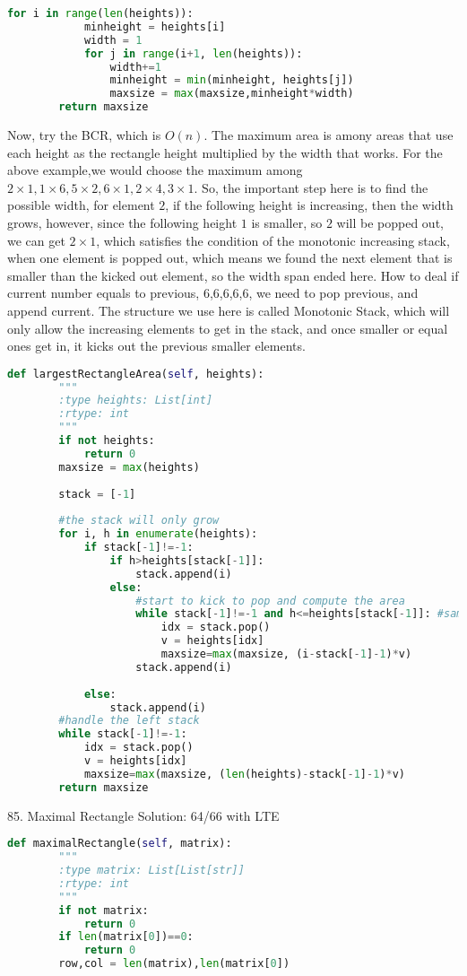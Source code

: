 \documentclass[../main.tex]{subfiles}
\begin{document}
\begin{examples}[resume]
\begin{lstlisting}[language = Python]
        for i in range(len(heights)):
            minheight = heights[i]
            width = 1
            for j in range(i+1, len(heights)):
                width+=1
                minheight = min(minheight, heights[j])
                maxsize = max(maxsize,minheight*width)
        return maxsize
\end{lstlisting}
Now, try the BCR, which is $O(n)$. The maximum area is amony areas that use each height as the rectangle  height multiplied by the width that works. For the above example,we would choose the maximum among $2\times 1, 1\times 6, 5\times 2, 6\times 1, 2\times 4, 3\times 1$. So, the important step here is to find the possible width, for element $2$, if the following height is increasing, then the width grows, however, since the following height $1$ is smaller, so $2$ will be popped out, we can get $2\times 1$, which satisfies the condition of the monotonic increasing stack, when one element is popped out, which means we found the next element that is smaller than the kicked out element, so the width span ended here. How to deal if current number equals to previous, 6,6,6,6,6, we need to pop previous, and append current. The structure we use here is called Monotonic Stack, which will only allow the increasing elements to get in the stack, and once smaller or equal ones get in, it kicks out the previous smaller elements.
\begin{lstlisting}[language = Python]
def largestRectangleArea(self, heights):
        """
        :type heights: List[int]
        :rtype: int
        """
        if not heights:
            return 0
        maxsize = max(heights)
        
        stack = [-1]
        
        #the stack will only grow
        for i, h in enumerate(heights):
            if stack[-1]!=-1:
                if h>heights[stack[-1]]:
                    stack.append(i)
                else:
                    #start to kick to pop and compute the area
                    while stack[-1]!=-1 and h<=heights[stack[-1]]: #same or equal needs to be pop out
                        idx = stack.pop()
                        v = heights[idx]
                        maxsize=max(maxsize, (i-stack[-1]-1)*v)
                    stack.append(i)
                
            else:
                stack.append(i)
        #handle the left stack
        while stack[-1]!=-1:
            idx = stack.pop()
            v = heights[idx]
            maxsize=max(maxsize, (len(heights)-stack[-1]-1)*v)
        return maxsize
\end{lstlisting}
85. Maximal Rectangle
Solution: 64/66 with LTE
\begin{lstlisting}[language = Python]
def maximalRectangle(self, matrix):
        """
        :type matrix: List[List[str]]
        :rtype: int
        """
        if not matrix:
            return 0
        if len(matrix[0])==0:
            return 0
        row,col = len(matrix),len(matrix[0])
        

\end{lstlisting}
\end{examples}
\end{document}
